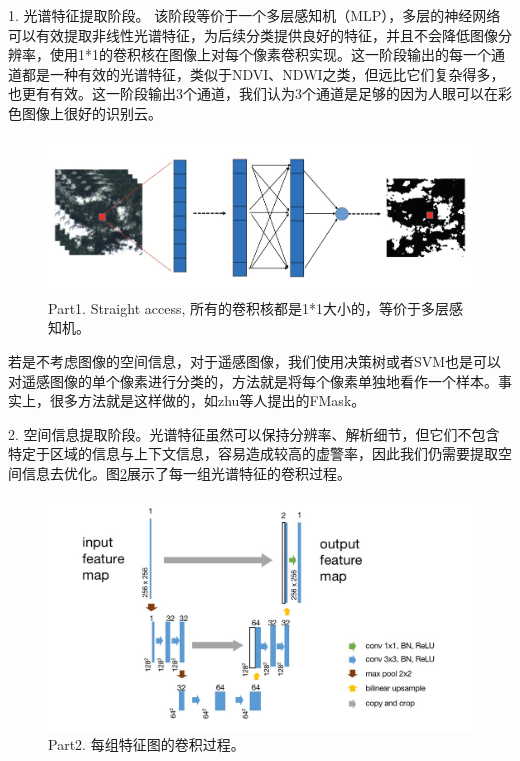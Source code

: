 \documentclass[UTF8]{ctexart}
\begin{document}
1. 光谱特征提取阶段。 该阶段等价于一个多层感知机（MLP），多层的神经网络可以有效提取非线性光谱特征，为后续分类提供良好的特征，并且不会降低图像分辨率，使用1*1的卷积核在图像上对每个像素卷积实现。这一阶段输出的每一个通道都是一种有效的光谱特征，类似于NDVI、NDWI之类，但远比它们复杂得多，也更有有效。这一阶段输出3个通道，我们认为3个通道是足够的因为人眼可以在彩色图像上很好的识别云。

\begin{figure}[H]
    \centering
    \includegraphics[scale=0.25]{../pic/part1.jpg}
    \caption[]{Part1. Straight access, 所有的卷积核都是1*1大小的，等价于多层感知机。}
    \label{pic:straight}
\end{figure}

若是不考虑图像的空间信息，对于遥感图像，我们使用决策树或者SVM也是可以对遥感图像的单个像素进行分类的，方法就是将每个像素单独地看作一个样本。事实上，很多方法就是这样做的，如zhu等人提出的FMask\cite{zhu2012object}。

2. 空间信息提取阶段。光谱特征虽然可以保持分辨率、解析细节，但它们不包含特定于区域的信息与上下文信息，容易造成较高的虚警率，因此我们仍需要提取空间信息去优化。图\ref{pic:part2}展示了每一组光谱特征的卷积过程。

\begin{figure}[H]
    \centering
    \includegraphics[scale=0.3]{../pic/groupcov.jpg}
    \caption[]{Part2. 每组特征图的卷积过程。}
    \label{pic:part2}
\end{figure}
\end{document}
